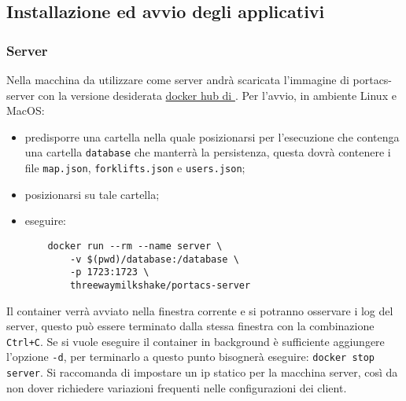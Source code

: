 \subsection{Installazione ed avvio degli applicativi}
    \subsubsection{Server}
    Nella macchina da utilizzare come server andrà scaricata l'immagine di portacs-server con la versione desiderata \href{https://hub.docker.com/r/threewaymilkshake}{docker hub di \group}.
    Per l'avvio, in ambiente Linux e MacOS:
    \begin{itemize}
        \item predisporre una cartella nella quale posizionarsi per l'esecuzione che contenga una cartella \texttt{database} che manterrà la persistenza, questa dovrà contenere i file \texttt{map.json}, \texttt{forklifts.json} e \texttt{users.json};
        \item posizionarsi su tale cartella;
        \item eseguire:
    \begin{verbatim}
    docker run --rm --name server \
        -v $(pwd)/database:/database \
        -p 1723:1723 \
        threewaymilkshake/portacs-server
    \end{verbatim}
    \end{itemize}
    Il container verrà avviato nella finestra corrente e si potranno osservare i log del server, questo può essere terminato dalla stessa finestra con la combinazione \texttt{Ctrl+C}. Se si vuole eseguire il container in background è sufficiente aggiungere l'opzione \texttt{-d}, per terminarlo a questo punto bisognerà eseguire: \texttt{docker stop server}.
    Si raccomanda di impostare un ip statico per la macchina server, così da non dover richiedere variazioni frequenti nelle configurazioni dei client.

